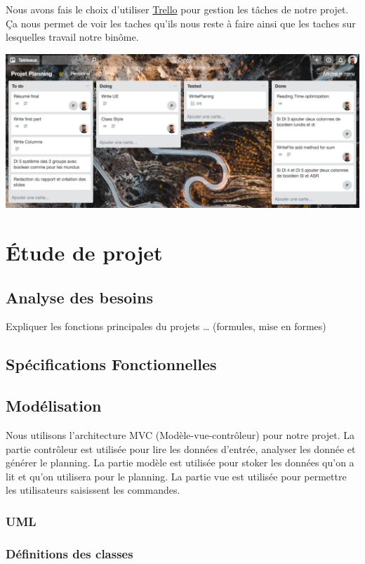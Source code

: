 \documentclass{polytech/polytech}
\begin{document}
	Nous avons fais le choix d'utiliser \href{https://trello.com/}{Trello} pour gestion les tâches de notre projet.
	Ça nous permet de voir les taches qu'ils nous reste à faire ainsi que les taches sur lesquelles travail notre binôme.
	
	\includegraphics[width=\textwidth]{./img/trello.png}	

	\chapter{Étude de projet}
	\section{Analyse des besoins}
	Expliquer les fonctions principales du projets … (formules, mise en formes)

	\section{Spécifications Fonctionnelles}

	\section{Modélisation}
	Nous utilisons l'architecture MVC (Modèle-vue-contrôleur) pour notre projet. La partie contrôleur est utilisée pour lire les données d'entrée, analyser les donnée et générer le planning. La partie modèle est utilisée pour stoker les données qu'on a lit et qu'on utilisera pour le planning. La partie vue est utilisée pour permettre les utilisateurs saisissent les commandes.

	\subsection{UML}

	\subsection{Définitions des classes}
\end{document}
